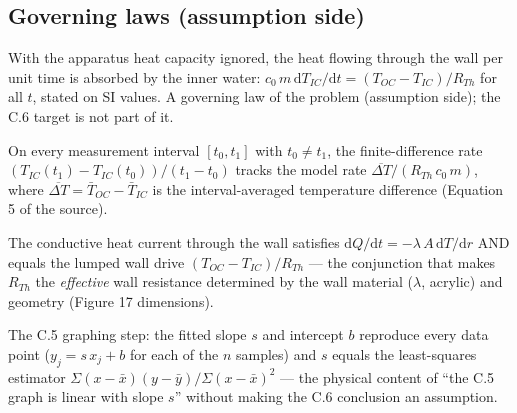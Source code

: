\subsection*{Governing laws (assumption side)}

\begin{definition}
\label{def:IPhO2026Problems_problem_IPhO_2026_4_C_6:CoolingModel}
With the apparatus heat capacity ignored, the heat flowing through the wall
per unit time is absorbed by the inner water:
$c_0\,m\,\mathrm{d}T_{IC}/\mathrm{d}t = (T_{OC} - T_{IC})/R_{Th}$ for all
$t$, stated on SI values. A governing law of the problem (assumption side);
the C.6 target is not part of it.
\end{definition}

\begin{definition}
\label{def:IPhO2026Problems_problem_IPhO_2026_4_C_6:FiniteDifferenceModel}
On every measurement interval $[t_0, t_1]$ with $t_0 \ne t_1$, the
finite-difference rate $(T_{IC}(t_1) - T_{IC}(t_0))/(t_1 - t_0)$ tracks the
model rate $\overline{\Delta T}/(R_{Th}\,c_0\,m)$, where
$\overline{\Delta T} = \bar T_{OC} - \bar T_{IC}$ is the interval-averaged
temperature difference (Equation 5 of the source).
\end{definition}

\begin{definition}
\label{def:IPhO2026Problems_problem_IPhO_2026_4_C_6:FourierRadialConductionLaw}
The conductive heat current through the wall satisfies
$\mathrm{d}Q/\mathrm{d}t = -\lambda\,A\,\mathrm{d}T/\mathrm{d}r$ AND equals
the lumped wall drive $(T_{OC} - T_{IC})/R_{Th}$ — the conjunction that
makes $R_{Th}$ the \emph{effective} wall resistance determined by the wall
material ($\lambda$, acrylic) and geometry (Figure 17 dimensions).
\end{definition}

\begin{definition}
\label{def:IPhO2026Problems_problem_IPhO_2026_4_C_6:IsLeastSquaresLine}
The C.5 graphing step: the fitted slope $s$ and intercept $b$ reproduce
every data point ($y_j = s\,x_j + b$ for each of the $n$ samples) and $s$
equals the least-squares estimator
$\Sigma(x - \bar x)(y - \bar y) / \Sigma(x - \bar x)^2$ — the physical
content of ``the C.5 graph is linear with slope $s$'' without making the
C.6 conclusion an assumption.
\end{definition}

